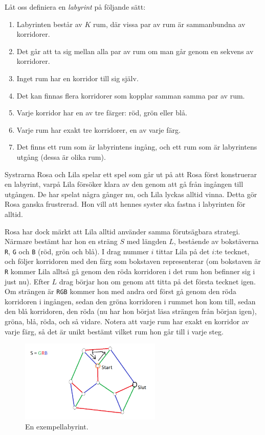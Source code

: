 \def\version{1}
Låt oss definiera en \textit{labyrint} på följande sätt:
\begin{enumerate}
  \item Labyrinten består av $K$ rum, där vissa par av rum är sammanbundna av korridorer.
  \item Det går att ta sig mellan alla par av rum om man går genom en sekvens av korridorer.
  \item Inget rum har en korridor till sig själv.
  \item Det kan finnas flera korridorer som kopplar samman samma par av rum.
  \item Varje korridor har en av tre färger: röd, grön eller blå.
  \item Varje rum har exakt tre korridorer, en av varje färg.
  \item Det finns ett rum som är labyrintens ingång, och ett rum som är labyrintens utgång (dessa är olika rum).
\end{enumerate}

Systrarna Rosa och Lila spelar ett spel som går ut på att Rosa först konstruerar en labyrint, varpå Lila försöker klara av den genom att gå från ingången till utgången.
De har spelat några gånger nu, och Lila lyckas alltid vinna.
Detta gör Rosa ganska frustrerad.
Hon vill att hennes syster ska fastna i labyrinten för alltid.

Rosa har dock märkt att Lila alltid använder samma förutsägbara strategi.
Närmare bestämt har hon en sträng $S$ med längden $L$, bestående av bokstäverna \texttt{R}, \texttt{G} och \texttt{B} (röd, grön och blå).
I drag nummer $i$ tittar Lila på det $i$:te tecknet, och följer korridoren med den färg som bokstaven representerar (om bokstaven är \texttt{R} kommer Lila alltså gå genom den röda korridoren i det rum hon befinner sig i just nu).
Efter $L$ drag börjar hon om genom att titta på det första tecknet igen.
Om strängen är \texttt{RGB} kommer hon med andra ord först gå genom den röda korridoren i ingången, sedan den gröna korridoren i rummet hon kom till, sedan den blå korridoren, den röda (nu har hon börjat läsa strängen från början igen), gröna, blå, röda, och så vidare.
Notera att varje rum har exakt en korridor av varje färg, så det är unikt bestämt vilket rum hon går till i varje steg.

\begin{figure}[h!]
  \centering
  \includegraphics[width=0.6\textwidth]{labyrintgraf2.png}
  \caption{En exempellabyrint.}
\end{figure}

